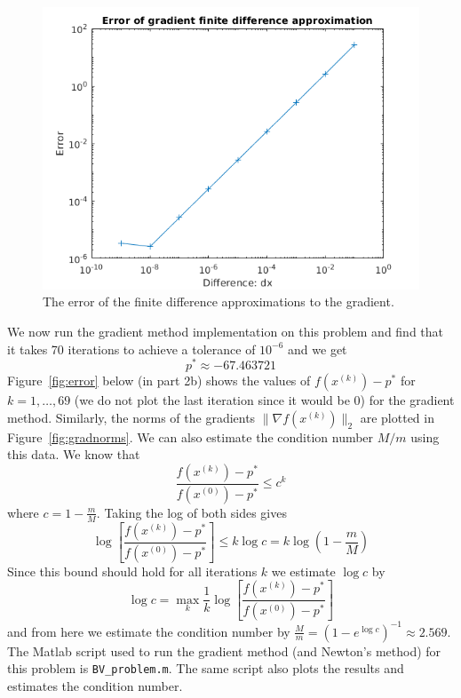 \documentclass[11pt]{amsart}
\begin{document}
\begin{enumerate}
\begin{enumerate}
\begin{figure}[H]
\centering
\includegraphics[width=5in]{grad_fd.png}
\caption{The error of the finite difference approximations to the gradient.}
\label{fig:grad_fd}
\end{figure}


We now run the gradient method implementation on this problem and find that it takes 70 iterations to achieve a tolerance of $10^{-6}$ and we get
\[
p^* \approx -67.463721
\]
Figure~\ref{fig:error} below (in part 2b) shows the values of $f(x^{(k)}) - p^*$ for $k = 1,\ldots,69$ (we do not plot the last iteration since it would be 0) for the gradient method.  Similarly, the norms of the gradients $\|\nabla f(x^{(k)})\|_2$ are plotted in Figure~\ref{fig:gradnorms}.  We can also estimate the condition number $M/m$ using this data.  We know that
\[
\frac{f(x^{(k)}) - p^*}{f(x^{(0)}) - p^*} \le c^k
\]
where $c = 1 - \frac{m}{M}$.  Taking the log of both sides gives
\[
\log \left[ \frac{f(x^{(k)}) - p^*}{f(x^{(0)}) - p^*} \right] \le k\log c = k\log \left( 1 - \frac{m}{M} \right)
\]
Since this bound should hold for all iterations $k$ we estimate $\log c$ by
\[
\log c = \max_{k} \frac{1}{k} \log \left[ \frac{f(x^{(k)}) - p^*}{f(x^{(0)}) - p^*} \right] 
\]
and from here we estimate the condition number by $\frac{M}{m} = (1 - e^{\log c})^{-1} \approx 2.569$.  The Matlab script used to run the gradient method (and Newton's method) for this problem is \texttt{BV\_problem.m}.  The same script also plots the results and estimates the condition number.

\end{enumerate}


\end{enumerate}
\end{document}

